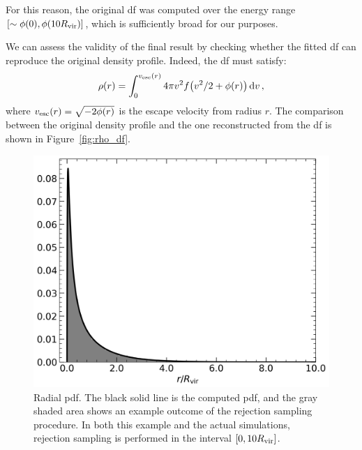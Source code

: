\documentclass[twocolumn, a4paper]{article}
\begin{document}
For this reason, the original \acrshort{df} was computed over the energy range \(\qty[\sim \phi\qty(0), \phi\qty(10 R_\text{vir})]\), which is sufficiently broad for our purposes.

We can assess the validity of the final result by checking whether the fitted \acrshort{df} can reproduce the original density profile. Indeed, the \acrshort{df} must satisfy:
\begin{equation}
    \rho\qty(r) = \int_0^{v_\text{esc}\qty(r)} 4\pi v^2 f\qty(v^2/2 + \phi\qty(r)) \dd{v},
    \label{eq:rho_df}
\end{equation}
where \(v_\text{esc}\qty(r) = \sqrt{-2 \phi\qty(r)}\) is the escape velocity from radius \(r\). The comparison between the original density profile and the one reconstructed from the \acrshort{df} is shown in Figure~\ref{fig:rho_df}.

\begin{figure}
    \centering
    \includegraphics[width=\columnwidth]{images/pdf_r.png}
    \caption{Radial \acrshort{pdf}. The black solid line is the computed \acrshort{pdf}, and the gray shaded area shows an example outcome of the rejection sampling procedure. In both this example and the actual simulations, rejection sampling is performed in the interval \(\qty[0, 10 R_\text{vir}]\).}
    \label{fig:pdf_r}
\end{figure}
\end{document}
